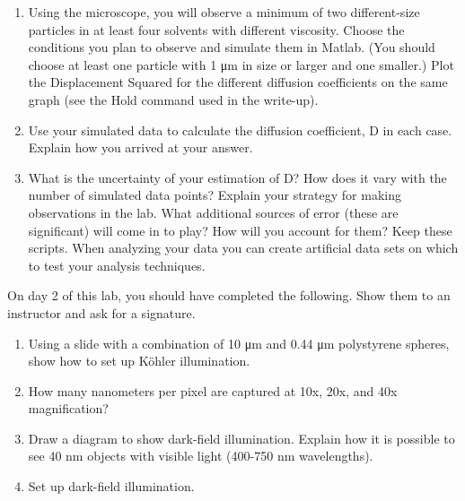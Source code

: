 \documentclass{../signatures}
\begin{document}
\begin{enumerate}

\item Using the microscope, you will observe a minimum of two different-size particles in at least four solvents with different viscosity. Choose the conditions you plan to observe and simulate them in Matlab. (You should choose at least one particle with 1 μm in size or larger and one smaller.) Plot the Displacement Squared for the different diffusion coefficients on the same graph (see the Hold command used in the write-up).

\item Use your simulated data to calculate the diffusion coefficient, D in each case. Explain how you arrived at your answer. 

\item What is the uncertainty of your estimation of D? How does it vary with the number of simulated data points? Explain your strategy for making observations in the lab. What additional sources of error (these are significant) will come in to play? How will you account for them? Keep these scripts. When analyzing your data you can create artificial data sets on which to test your analysis techniques. 
\\[36pt]
\end{enumerate}


\midlab

On day 2 of this lab, you should have completed the following. Show them to an instructor and ask for a signature.

\begin{enumerate}

    \item Using a slide with a combination of 10 μm and 0.44 μm polystyrene spheres, show how to set up Köhler illumination.
    
    \item How many nanometers per pixel are captured at 10x, 20x, and 40x magnification?
    
    \item Draw a diagram to show dark-field illumination. Explain how it is possible to see 40 nm objects with visible light (400-750 nm wavelengths).
    
    \item Set up dark-field illumination.
\\[36pt]
\end{enumerate}
\end{document}
